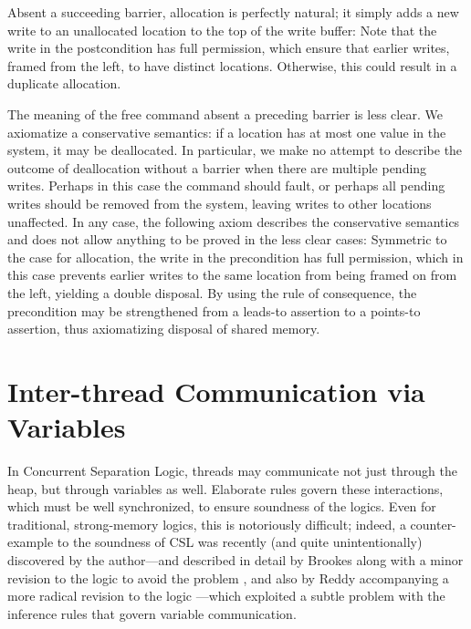 \documentclass[11pt]{report}
\begin{document}
Absent a succeeding barrier, allocation is perfectly natural; it simply adds a new write to an unallocated location to the top of the write buffer:  Note that the write in the postcondition has full permission, which ensure that earlier writes, framed from the left, to have distinct locations. Otherwise, this could result in a duplicate allocation.

The meaning of the free command absent a preceding barrier is less clear. We axiomatize a conservative semantics: if a location has at most one value in the system, it may be deallocated. In particular, we make no attempt to describe the outcome of deallocation without a barrier when there are multiple pending writes. Perhaps in this case the command should fault, or perhaps all pending writes should be removed from the system, leaving writes to other locations unaffected. In any case, the following axiom describes the conservative semantics and does not allow anything to be proved in the less clear cases:  Symmetric to the case for allocation, the write in the precondition has full permission, which in this case prevents earlier writes to the same location from being framed on from the left, yielding a double disposal. By using the rule of consequence, the precondition may be strengthened from a leads-to assertion to a points-to assertion, thus axiomatizing disposal of shared memory.

\section{Inter-thread Communication via Variables}

In Concurrent Separation Logic, threads may communicate not just through the heap, but through variables as well. Elaborate rules govern these interactions, which must be well synchronized, to ensure soundness of the logics. Even for traditional, strong-memory logics, this is notoriously difficult; indeed, a counter-example to the soundness of CSL was recently (and quite unintentionally) discovered by the author---and described in detail by Brookes along with a minor revision to the logic to avoid the problem \cite{Brookes20115}, and also by Reddy accompanying a more radical revision to the logic \cite{DBLP:conf/popl/ReddyR12}---which exploited a subtle problem with the inference rules that govern variable communication. 
\end{document}

